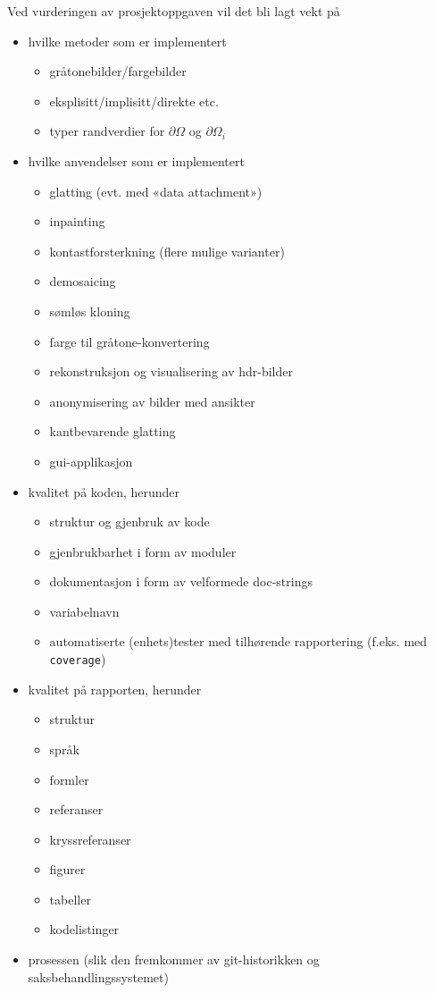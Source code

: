 \documentclass[11pt,a4paper]{article}
\begin{document}
Ved vurderingen av prosjektoppgaven vil det bli lagt vekt på
\begin{itemize}[noitemsep]
\item hvilke metoder som er implementert
  \begin{itemize}[noitemsep]
  \item gråtonebilder/fargebilder
  \item eksplisitt/implisitt/direkte etc.
  \item typer randverdier for $\partial\Omega$ og $\partial\Omega_i$
  \end{itemize}
\item hvilke anvendelser som er implementert
  \begin{itemize}[noitemsep]
  \item glatting (evt. med «data attachment»)
  \item inpainting
  \item kontastforsterkning (flere mulige varianter)
  \item demosaicing
  \item sømløs kloning
  \item farge til gråtone-konvertering
  \item rekonstruksjon og visualisering av hdr-bilder 
  \item anonymisering av bilder med ansikter
  \item kantbevarende glatting
  \item gui-applikasjon
  \end{itemize}
\item kvalitet på koden, herunder
  \begin{itemize}[noitemsep]
  \item struktur og gjenbruk av kode
  \item gjenbrukbarhet i form av moduler
  \item dokumentasjon i form av velformede doc-strings
  \item variabelnavn
  \item automatiserte (enhets)tester med tilhørende rapportering (f.eks. med \texttt{coverage})
  \end{itemize}
\item kvalitet på rapporten, herunder
  \begin{itemize}[noitemsep]
  \item struktur
  \item språk
  \item formler
  \item referanser
  \item kryssreferanser
  \item figurer
  \item tabeller
  \item kodelistinger
  \end{itemize}
\item prosessen (slik den fremkommer av git-historikken og saksbehandlingssystemet)
\end{itemize}
\end{document}
